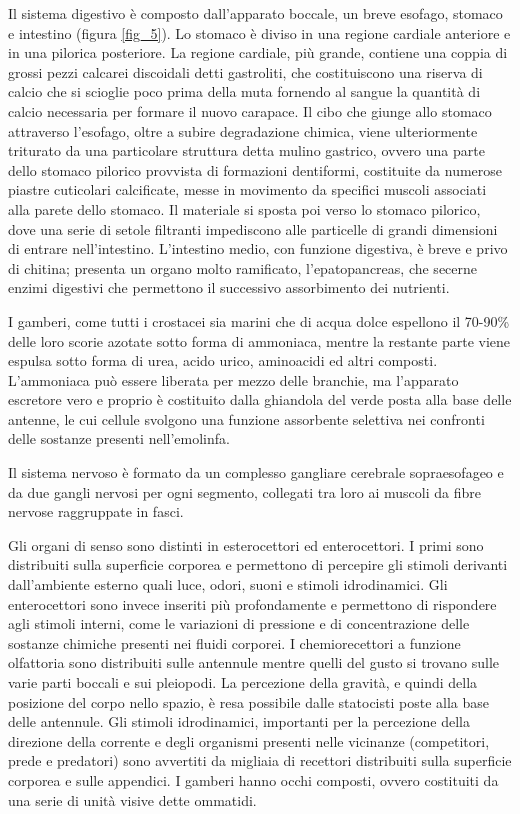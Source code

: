 \documentclass[11pt,a4paper,italian,twoside,openany]{memoir}
\begin{document}
Il sistema digestivo è composto dall'apparato boccale, un breve esofago, stomaco e intestino (figura \ref{fig_5}). Lo stomaco è diviso in una regione cardiale anteriore e in una pilorica posteriore. La regione cardiale, più grande, contiene una coppia di grossi pezzi calcarei discoidali detti gastroliti, che costituiscono una riserva di calcio che si scioglie poco prima della muta fornendo al sangue la quantità di calcio necessaria per formare il nuovo carapace. Il cibo che giunge allo stomaco attraverso l'esofago, oltre a subire degradazione chimica, viene ulteriormente triturato da una particolare struttura detta mulino gastrico, ovvero una parte dello stomaco pilorico provvista di formazioni dentiformi, costituite da numerose piastre cuticolari calcificate, messe in movimento da specifici muscoli associati alla parete dello stomaco. Il materiale si sposta poi verso lo stomaco pilorico, dove una serie di setole filtranti impediscono alle particelle di grandi dimensioni di entrare nell'intestino. L'intestino medio, con funzione digestiva, è breve e privo di chitina; presenta un organo molto ramificato, l'epatopancreas, che secerne enzimi digestivi che permettono il successivo assorbimento dei nutrienti.

I gamberi, come tutti i crostacei sia marini che di acqua dolce espellono il 70-90\% delle loro scorie azotate sotto forma di ammoniaca, mentre la restante parte viene espulsa sotto forma di urea, acido urico, aminoacidi ed altri composti. L'ammoniaca può essere liberata per mezzo delle branchie, ma l'apparato escretore vero e proprio è costituito dalla ghiandola del verde posta alla base delle antenne, le cui cellule svolgono una funzione assorbente selettiva nei confronti delle sostanze presenti nell'emolinfa. 

Il sistema nervoso è formato da un complesso gangliare cerebrale sopraesofageo e da due gangli nervosi per ogni segmento, collegati tra loro ai muscoli da fibre nervose raggruppate in fasci. 

Gli organi di senso sono distinti in esterocettori ed enterocettori. I primi sono distribuiti sulla superficie corporea e permettono di percepire gli stimoli derivanti dall'ambiente esterno quali luce, odori, suoni e stimoli idrodinamici. Gli enterocettori sono invece inseriti più profondamente e permettono di rispondere agli stimoli interni, come le variazioni di pressione e di concentrazione delle sostanze chimiche presenti nei fluidi corporei. I chemiorecettori a funzione olfattoria sono distribuiti sulle antennule mentre quelli del gusto si trovano sulle varie parti boccali e sui pleiopodi. La percezione della gravità, e quindi della posizione del corpo nello spazio, è resa possibile dalle statocisti poste alla base delle antennule. Gli stimoli idrodinamici, importanti per la percezione della direzione della corrente e degli organismi presenti nelle vicinanze (competitori, prede e predatori) sono avvertiti da migliaia di recettori distribuiti sulla superficie corporea e sulle appendici. I gamberi hanno occhi composti, ovvero costituiti da una serie di unità visive dette ommatidi. 
\end{document}
